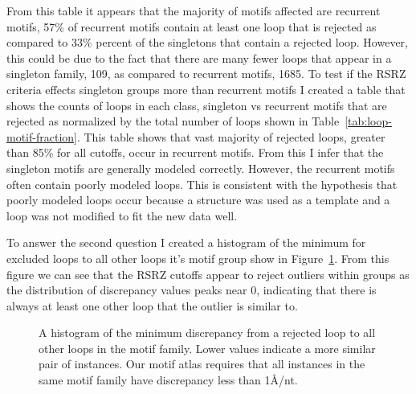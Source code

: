 From this table it appears that the majority of motifs affected are recurrent
motifs, 57\% of recurrent motifs contain at least one loop that is rejected as
compared to 33\% percent of the singletons that contain a rejected loop.
However, this could be due to the fact that there are many fewer loops that
appear in a singleton family, 109, as compared to recurrent motifs, 1685. To
test if the RSRZ criteria effects singleton groups more than recurrent motifs I
created a table that shows the counts of loops in each class, singleton vs
recurrent motifs that are rejected as normalized by the total number of loops
shown in Table~\ref{tab:loop-motif-fraction}. This table shows that vast
majority of rejected loops, greater than 85\% for all cutoffs, occur in
recurrent motifs. From this I infer that the singleton motifs are generally
modeled correctly. However, the recurrent motifs  often contain poorly  modeled
loops. This is consistent with the hypothesis that poorly modeled loops occur
because a structure was used as a template and a loop was not modified to fit
the new data well.

\begin{table}
  \caption{A table showing the number of motifs for singletons vs recurrent
    motifs with rejected loops for each cutoff tested here. The counts are the
    number of loops rejected by each cutoff while the percents in the
    parenthesis are the fraction of all motifs of that type that are are
    affected by the cutoff. The upper left column indicates that there are 120
    total motifs that contain rejected loops, and this is 46\% (120/256) of all
    motifs, while the column to the right indicates that 33\% (36/109) of all
  singleton motifs are rejected by the RSRZ \textgreater 1 cutoff.}
  \label{tab:number-motifs-altered}
\end{table}


To answer the second question I created a histogram of the minimum for excluded
loops to all other loops it’s motif group show in
Figure~\ref{fig:exclude-min-disc}. From this figure we can see that the RSRZ
cutoffs appear to reject outliers within groups as the distribution of
discrepancy values peaks near 0, indicating that there is always at least one
other loop that the outlier is similar to.

\begin{figure}
  \caption{A histogram of the minimum discrepancy from a rejected loop to all
    other loops in the motif family. Lower values indicate a more similar pair
    of instances. Our motif atlas requires that all instances in the same motif
  family have discrepancy less than 1{\AA}/nt.}
  \label{fig:exclude-min-disc}
\end{figure}

